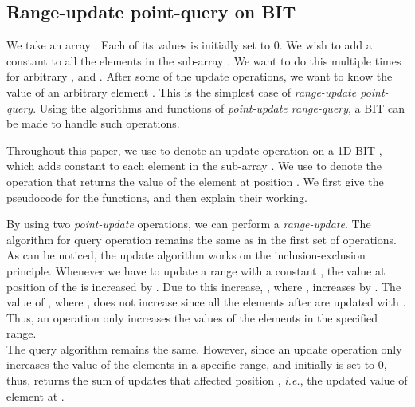 \documentclass[a4paper]{article}
\begin{document}
\subsection{Range-update point-query on BIT}
We take an array . Each of its values is initially set to 0. We wish to add a constant  to all the elements in the sub-array . We want to do this multiple times for arbitrary ,  and . After some of the update operations, we want to know the value of an arbitrary element . This is the simplest case of \textit{range-update point-query}. Using the algorithms and functions of \textit{point-update range-query}, a BIT can be made to handle such operations.

\vspace{2 mm}
Throughout this paper, we use  to denote an update operation on a 1D BIT , which adds constant  to each element in the sub-array . We use  to denote the operation that returns the value of the element at position . We first give the pseudocode for the functions, and then explain their working.

\vspace {3 mm}
\noindent
{}
\begin{algorithmic}[1]

        \State 
        \State 
\EndFunction
\end{algorithmic}

\vspace {3 mm}
\noindent
{}
\begin{algorithmic}[1]

        \State 
        \State 
        \While {}
            \State 
            \State 
        \EndWhile
        \State \Return 
\EndFunction
\end{algorithmic}

\vspace{3 mm}
By using two \textit{point-update} operations, we can perform a \textit{range-update}. The algorithm for query operation remains the same as in the first set of operations. As can be noticed, the update algorithm works on the inclusion-exclusion principle. Whenever we have to update a range  with a constant , the value at position  of the  is increased by . Due to this increase, , where , increases by . The value of , where , does not increase since all the elements after  are updated with . Thus, an  operation only increases the values of the elements in the specified range.\\
The query algorithm remains the same. However, since an update operation only increases the value of the elements in a specific range, and initially  is set to 0, thus,  returns the sum of updates that affected position , \textit{i.e.}, the updated value of element at . 
\end{document}
